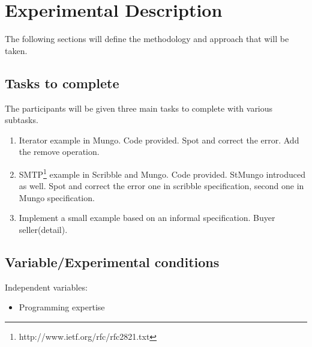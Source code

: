 \documentclass[11pt,notitlepage]{article}
\begin{document}
\section{Experimental Description}
The following sections will define the methodology and approach that will be taken.

\subsection{Tasks to complete}
The participants will be given three main tasks to complete with various subtasks.

\begin{enumerate}
  \item Iterator example in Mungo. Code provided. Spot and correct the error. Add the remove operation.
  \item SMTP\footnote{http://www.ietf.org/rfc/rfc2821.txt} example in Scribble and Mungo. Code provided. StMungo introduced as well. Spot and correct the error one in scribble specification, second one in Mungo specification.

  \item Implement a small example based on an informal specification. Buyer seller(detail).
\end{enumerate}

\subsection{Variable/Experimental conditions}




Independent variables:
\begin{itemize}
  \item Programming expertise
\end{itemize}
\end{document}
